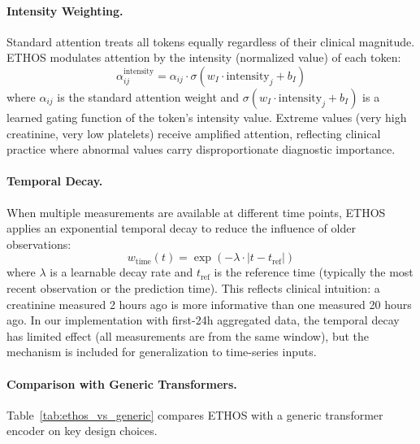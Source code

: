 \paragraph{Intensity Weighting.} Standard attention treats all tokens equally regardless of their clinical magnitude. ETHOS modulates attention by the intensity (normalized value) of each token:
\begin{equation}
\alpha_{ij}^{\text{intensity}} = \alpha_{ij} \cdot \sigma(w_I \cdot \text{intensity}_j + b_I)
\end{equation}
where $\alpha_{ij}$ is the standard attention weight and $\sigma(w_I \cdot \text{intensity}_j + b_I)$ is a learned gating function of the token's intensity value. Extreme values (very high creatinine, very low platelets) receive amplified attention, reflecting clinical practice where abnormal values carry disproportionate diagnostic importance.

\paragraph{Temporal Decay.} When multiple measurements are available at different time points, ETHOS applies an exponential temporal decay to reduce the influence of older observations:
\begin{equation}
w_{\text{time}}(t) = \exp(-\lambda \cdot |t - t_{\text{ref}}|)
\end{equation}
where $\lambda$ is a learnable decay rate and $t_{\text{ref}}$ is the reference time (typically the most recent observation or the prediction time). This reflects clinical intuition: a creatinine measured 2 hours ago is more informative than one measured 20 hours ago. In our implementation with first-24h aggregated data, the temporal decay has limited effect (all measurements are from the same window), but the mechanism is included for generalization to time-series inputs.

\paragraph{Comparison with Generic Transformers.} Table~\ref{tab:ethos_vs_generic} compares ETHOS with a generic transformer encoder on key design choices.

